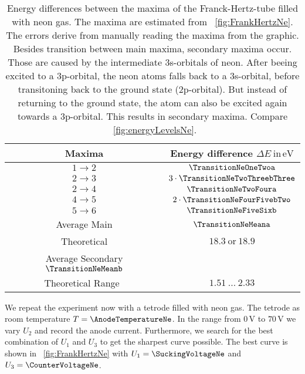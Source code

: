 \documentclass[a4paper,10pt,twocolumn]{article}
\newcommand{\volt}{\, \mathrm{V}}
\newcommand{\eV}{\, \mathrm{eV}}
\newcommand{\TheoreticalTransitionNea}{18.3 \ \mathrm{or} \ 18.9}
\newcommand{\TheoreticalTransitionNeb}{1.51 \ \dots \ 2.33}
\begin{document}
    \begin{table}[httb]
        \centering
        \begin{tabular}{c c}
            \hline \hline
            Maxima & Energy difference $\Delta E \ \mathrm{in} \eV$ \\
            \hline
            $1 \rightarrow 2$ & $\TransitionNeOneTwoa$ \\
            $2 \rightarrow 3$ & $3 \cdot \TransitionNeTwoThreebThree$ \\
            $2 \rightarrow 4$ & $\TransitionNeTwoFoura$\\
            $4 \rightarrow 5$ & $2 \cdot \TransitionNeFourFivebTwo$\\
            $5 \rightarrow 6$ & $\TransitionNeFiveSixb$\\
            \hline
            Average Main & $\TransitionNeMeana$\\
            Theoretical & $\TheoreticalTransitionNea$ \\
            Average Secondary $\TransitionNeMeanb$\\
            Theoretical Range~\cite{neonSpectrum} & $\TheoreticalTransitionNeb$
            \hline
            \hline
        \end{tabular}
        \caption{Energy differences between the maxima of the Franck-Hertz-tube filled with neon gas.
        The maxima are estimated from ~\autoref{fig:FrankHertzNe}.
        The errors derive from manually reading the maxima from the graphic.
        Besides transition between main maxima, secondary maxima occur.
        Those are caused by the intermediate 3s-orbitals of neon.
        After beeing excited to a 3p-orbital, the neon atoms falls back to a 3s-orbital, before 
        transitoning back to the ground state (2p-orbital).
        But instead of returning to the ground state, the atom can also be excited again towards a 3p-orbital.
        This results in secondary maxima.
        Compare ~\autoref{fig:energyLevelsNe}.
        }
        \label{tab:transitionNe}
    \end{table}

    We repeat the experiment now with a tetrode filled with neon gas.
    The tetrode as room temperature $T = \AnodeTemperatureNe$.
    In the range from $0\volt$ to $70\volt$ we vary $U_2$ and record the anode current.
    Furthermore, we search for the best combination of $U_1$ and $U_3$ to get the sharpest curve possible.
    The best curve is shown in ~\autoref{fig:FrankHertzNe} with $U_1 = \SuckingVoltageNe$ and $U_3 = \CounterVoltageNe$.
    
\end{document}
